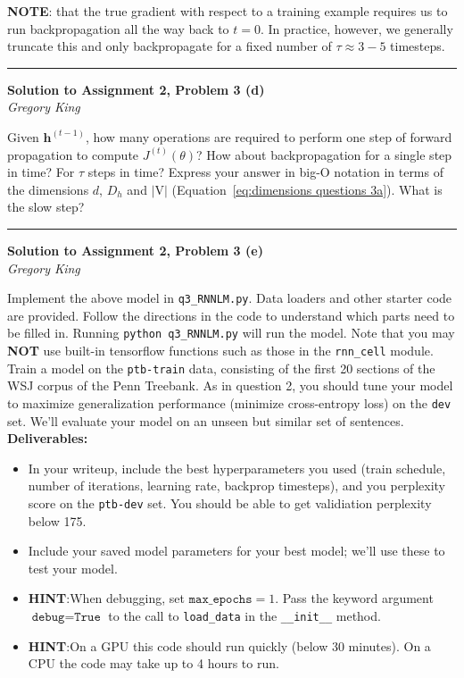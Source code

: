 \documentclass[letter,12pt]{article}
\newcommand{\myhwtitle}[3]
{\begin{center}
{\large {\bf Solution to Assignment {#1}, Problem {#2}}}\\
\medskip
{\it {#3}} %
\end{center}}
\newcommand{\solutionsAuthor}{Gregory King}
\begin{document}
\noindent\textbf{NOTE}: that the true gradient with respect to a training example requires us to run backpropagation all the way back to $t=0$. In practice, however, we generally truncate this and only backpropagate for a fixed number of $\tau\approx3-5$ timesteps.

\vspace{5mm}
\noindent\rule{\textwidth}{0.4pt}

\clearpage

\myhwtitle{2}{3 (d)}{\solutionsAuthor}

\bigskip

\noindent Given ${\boldsymbol h}^{(t-1)}$, how many operations are required to perform one step of forward propagation to compute $J^{(t)}(\theta)$? How about backpropagation for a single step in time? For $\tau$ steps in time? Express your answer in big-O notation in terms of the dimensions $d$, $D_{h}$ and $|\textrm{V}|$ (Equation~\ref{eq:dimensions questions 3a}). What is the slow step?

\vspace{5mm}
\noindent\rule{\textwidth}{0.4pt}

\clearpage

\myhwtitle{2}{3 (e)}{\solutionsAuthor}

\bigskip

\noindent Implement the above model in \texttt{q3\_RNNLM.py}. Data loaders and other starter code are provided. Follow the directions in the code to understand which parts need to be filled in. Running \texttt{python q3\_RNNLM.py} will run the model. Note that you may \textbf{NOT} use built-in tensorflow functions such as those in the \texttt{rnn\_cell} module.\\

\noindent Train a model on the \texttt{ptb-train} data, consisting of the first 20 sections of the WSJ corpus of the Penn Treebank. As in question 2, you should tune your model to maximize generalization performance (minimize cross-entropy loss) on the \texttt{dev} set. We'll evaluate your model on an unseen but similar set of sentences.\\

{\Large \textbf{Deliverables:}}
\begin{itemize}
\item{In your writeup, include the best hyperparameters you used (train schedule, number of iterations, learning rate, backprop timesteps), and you perplexity score on the \texttt{ptb-dev} set. You should be able to get validiation perplexity below 175.}
\item{Include your saved model parameters for your best model; we'll use these to test your model.}
\item{\textbf{HINT}:When debugging, set $\texttt{max\_epochs} = 1$. Pass the keyword argument $\texttt{debug}=\texttt{True}$ to the call to \texttt{load\_data} in the \texttt{\_\_init\_\_} method.}
\item{\textbf{HINT}:On a GPU this code should run quickly (below 30 minutes). On a CPU the code may take up to 4 hours to run.}
\end{itemize}
\end{document}
